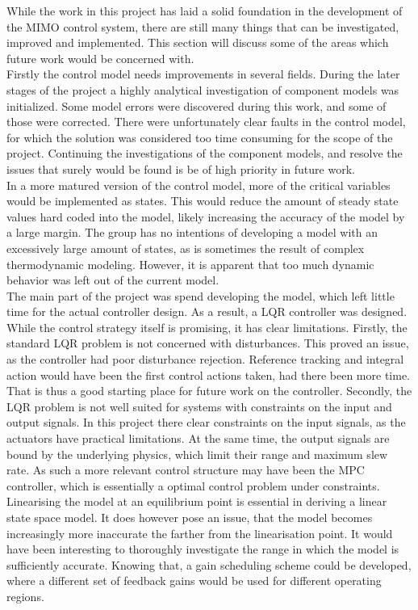 While the work in this project has laid a solid foundation in the development of the MIMO control system, there are still many things that can be investigated, improved and implemented. This section will discuss some of the areas which future work would be concerned with.\\

Firstly the control model needs improvements in several fields. During the later stages of the project a highly analytical investigation of component models was initialized. Some model errors were discovered during this work, and some of those were corrected. There were unfortunately clear faults in the control model, for which the solution was considered too time consuming for the scope of the project. Continuing the investigations of the component models, and resolve the issues that surely would be found is be of high priority in future work. \\

In a more matured version of the control model, more of the critical variables would be implemented as states. This would reduce the amount of steady state values hard coded into the model, likely increasing the accuracy of the model by a large margin. The group has no intentions of developing a model with an excessively large amount of states, as is sometimes the result of complex thermodynamic modeling. However, it is apparent that too much dynamic behavior was left out of the current model.\\

The main part of the project was spend developing the model, which left little time for the actual controller design. As a result, a LQR controller was designed. While the control strategy itself is promising, it has clear limitations. Firstly, the standard LQR problem is not concerned with disturbances. This proved an issue, as the controller had poor disturbance rejection. Reference tracking and integral action would have been the first control actions taken, had there been more time. That is thus a good starting place for future work on the controller. Secondly, the LQR problem is not well suited for systems with constraints on the input and output signals. In this project there clear constraints on the input signals, as the actuators have practical limitations. At the same time, the output signals are bound by the underlying physics, which limit their range and maximum slew rate. As such a more relevant control structure may have been the MPC controller, which is essentially a optimal control problem under constraints.\\

Linearising the model at an equilibrium point is essential in deriving a linear state space model. It does however pose an issue, that the model becomes increasingly more inaccurate the farther from the linearisation point. It would have been interesting to thoroughly investigate the range in which the model is sufficiently accurate. Knowing that, a gain scheduling scheme could be developed, where a different set of feedback gains would be used for different operating regions. 